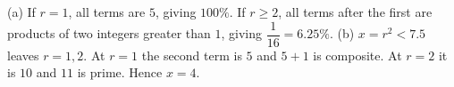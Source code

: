 (a) If $r=1$, all terms are $5$, giving $100\%$. If $r\ge2$, all terms after the first are products of two integers greater than $1$, giving $\dfrac{1}{16}=6.25\%$. (b) $x=r^2<7.5$ leaves $r=1,2$. At $r=1$ the second term is $5$ and $5+1$ is composite. At $r=2$ it is $10$ and $11$ is prime. Hence $\boxed{x=4}$.
